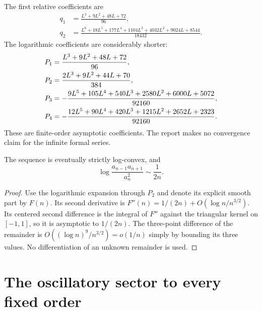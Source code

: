\documentclass[11pt,letterpaper]{article}
\numberwithin{equation}{section}
\begin{document}
The first relative coefficients are
\begin{align}
 q_1&=\frac{L^3+9L^2+48L+72}{96},\label{sma:eq:q1}\\
 q_2&=\frac{L^6+18L^5+177L^4+1104L^3+4032L^2+9024L+8544}{18432}.
\end{align}
The logarithmic coefficients are considerably shorter:
\begin{align}
 P_1&=\frac{L^3+9L^2+48L+72}{96},\notag\\
 P_2&=\frac{2L^3+9L^2+44L+70}{384},\notag\\
 P_3&=-\frac{9L^5+105L^4+540L^3+2580L^2+6000L+5072}{92160},\label{sma:eq:P}\\
 P_4&=-\frac{12L^5+90L^4+420L^3+1215L^2+2652L+2323}{92160}.\notag
\end{align}
These are finite-order asymptotic coefficients. The report makes no convergence claim for the infinite formal series.

\begin{corollary}
The sequence is eventually strictly log-convex, and
\[
 \log\frac{a_{n-1}a_{n+1}}{a_n^2}\sim\frac1{2n}.
\]
\end{corollary}
\begin{proof}
Use the logarithmic expansion through $P_2$ and denote its explicit smooth part by $F(n)$. Its second derivative is $F''(n)=1/(2n)+O(\log n/n^{3/2})$. Its centered second difference is the integral of $F''$ against the triangular kernel on $[-1,1]$, so it is asymptotic to $1/(2n)$. The three-point difference of the remainder is $O((\log n)^9/n^{3/2})=o(1/n)$ simply by bounding its three values. No differentiation of an unknown remainder is used.
\end{proof}

\section{The oscillatory sector to every fixed order}
\end{document}
